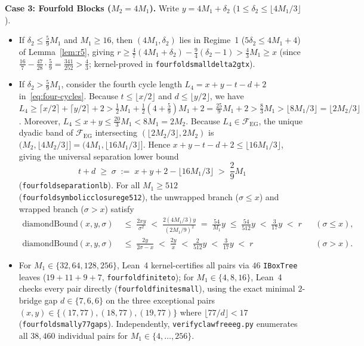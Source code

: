 \documentclass[11pt,reqno]{amsart}
\theoremstyle{plain}
\theoremstyle{definition}
\theoremstyle{remark}
\newcommand{\FEG}{\mathcal{F}_{\mathrm{EG}}}
\DeclareRobustCommand{\_}{\ifmmode\text{\textunderscore}\else\textunderscore\allowbreak\fi}
\begin{document}
\medskip
\noindent\textbf{Case 3: Fourfold Blocks ($M_2 = 4 M_1$).}
Write $y = 4 M_1 + \delta_2$ ($1 \le \delta_2 \le \lfloor 4M_1/3 \rfloor$).
\begin{itemize}[leftmargin=1.6em]
  \item If $\delta_2 \le \frac{5}{9} M_1$ and $M_1 \ge 16$, then $(4M_1, \delta_2)$ lies in Regime~1 ($5\delta_2 \le 4M_1 + 4$) of Lemma~\ref{lem:r5}, giving $r \ge \frac{4}{7}(4M_1 + \delta_2) - \frac{9}{4}(\delta_2 - 1) > \frac{4}{3} M_1 \ge x$ (since $\frac{16}{7} - \frac{47}{28}\cdot \frac{5}{9} = \frac{341}{252} > \frac{4}{3}$; kernel-proved in \texttt{fourfold\_small\_delta2\_gt\_x}).
  \item If $\delta_2 > \frac{5}{9} M_1$, consider the fourth cycle length $L_4 = x + y - t - d + 2$ in~\eqref{eq:four-cycles}. Because $t \le \lfloor x/2 \rfloor$ and $d \le \lfloor y/2 \rfloor$, we have $L_4 \ge \lceil x/2 \rceil + \lceil y/2 \rceil + 2 > \frac{1}{2}M_1 + \frac{1}{2}(4 + \frac{5}{9})M_1 + 2 = \frac{25}{9} M_1 + 2 > \frac{8}{3} M_1 > \lfloor 8M_1/3 \rfloor = \lfloor 2 M_2 / 3 \rfloor$. Moreover, $L_4 \le x + y \le \frac{20}{3} M_1 < 8 M_1 = 2 M_2$. Because $L_4 \in \FEG$, the unique dyadic band of $\FEG$ intersecting $(\lfloor 2 M_2 / 3 \rfloor, 2 M_2)$ is $(M_2, \lfloor 4M_2/3 \rfloor] = (4M_1, \lfloor 16M_1/3 \rfloor]$. Hence $x + y - t - d + 2 \le \lfloor 16M_1/3 \rfloor$, giving the universal separation lower bound
  \[
    t + d \;\ge\; \sigma \;:=\; x + y + 2 - \lfloor 16 M_1 / 3 \rfloor \;>\; \frac{2}{9} M_1
  \]
  (\texttt{fourfold\_separation\_lb}). For all $M_1 \ge 512$ (\texttt{fourfold\_symbolic\_closure\_ge512}), the unwrapped branch ($\sigma \le x$) and wrapped branch ($\sigma > x$) satisfy
  \begin{align*}
    \mathrm{diamondBound}(x, y, \sigma) &\;\le\; \frac{2 x y}{\sigma^2} \;<\; \frac{2(4M_1/3)y}{(2M_1/9)^2} \;=\; \frac{54}{M_1} y \;\le\; \frac{54}{512} y \;<\; \frac{3}{17} y \;<\; r && (\sigma \le x),\\
    \mathrm{diamondBound}(x, y, \sigma) &\;\le\; \frac{2y}{2\sigma - x} \;<\; \frac{2y}{x} \;<\; \frac{2}{512} y \;<\; \frac{3}{17} y \;<\; r && (\sigma > x).
  \end{align*}
  \item For $M_1 \in \{32, 64, 128, 256\}$, Lean~4 kernel-certifies all pairs via $46$ \texttt{IBoxTree} leaves ($19 + 11 + 9 + 7$, \texttt{fourfold\_finite\_32\_to\_256}); for $M_1 \in \{4, 8, 16\}$, Lean~4 checks every pair directly (\texttt{fourfold\_finite\_small\_4\_8\_16}), using the exact minimal $2$-bridge gap $d \in \{7, 6, 6\}$ on the three exceptional pairs $(x, y) \in \{(17, 77), (18, 77), (19, 77)\}$ where $\lfloor 77/d \rfloor < 17$ (\texttt{fourfold\_small\_16\_y77\_gaps}). Independently, \texttt{verify\_clawfree\_eg.py} enumerates all $38{,}460$ individual pairs for $M_1 \in \{4, \dots, 256\}$.
\end{itemize}
\end{document}
